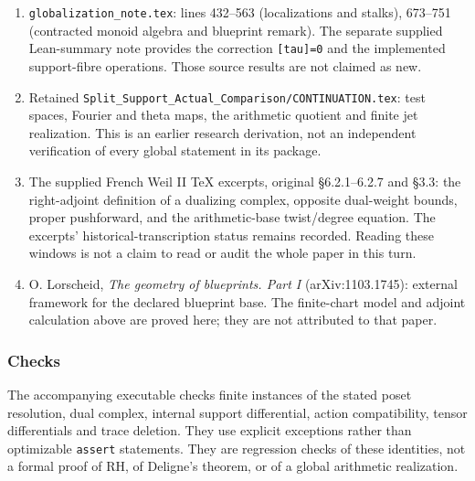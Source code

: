 \begin{enumerate}
\def\labelenumi{\arabic{enumi}.}
\tightlist
\item
  \texttt{globalization\_note.tex}: lines 432--563 (localizations and stalks), 673--751 (contracted monoid algebra and blueprint remark). The separate supplied Lean-summary note provides the correction \texttt{{[}tau{]}=0} and the implemented support-fibre operations. Those source results are not claimed as new.
\item
  Retained \texttt{Split\_Support\_Actual\_Comparison/CONTINUATION.tex}: test spaces, Fourier and theta maps, the arithmetic quotient and finite jet realization. This is an earlier research derivation, not an independent verification of every global statement in its package.
\item
  The supplied French Weil II TeX excerpts, original §6.2.1--6.2.7 and §3.3: the right-adjoint definition of a dualizing complex, opposite dual-weight bounds, proper pushforward, and the arithmetic-base twist/degree equation. The excerpts' historical-transcription status remains recorded. Reading these windows is not a claim to read or audit the whole paper in this turn.
\item
  O. Lorscheid, \emph{The geometry of blueprints. Part I} (arXiv:1103.1745): external framework for the declared blueprint base. The finite-chart model and adjoint calculation above are proved here; they are not attributed to that paper.
\end{enumerate}

\subsubsection{Checks}\label{endpoint-tau_base--checks}

The accompanying executable checks finite instances of the stated poset resolution, dual complex, internal support differential, action compatibility, tensor differentials and trace deletion. They use explicit exceptions rather than optimizable \texttt{assert} statements. They are regression checks of these identities, not a formal proof of RH, of Deligne's theorem, or of a global arithmetic realization.
